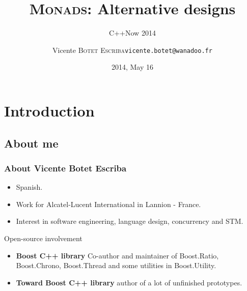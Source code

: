 \documentclass[xcolor=dvipsnames]{beamer}
\title{\textsc{Monads}: Alternative designs }
\subtitle{C++Now 2014}
\author[\textsc{Vicente Botet}]{Vicente \textsc{Botet Escriba}\texttt{vicente.botet@wanadoo.fr}}
\institute[Alcatel-Lucent]{Alcatel-Lucent International-Lannion}
\date[]{2014, May 16}
\begin{document}
\maketitle

\section{Introduction}

\subsection{About me}

\begin{frame}
\frametitle{About Vicente Botet Escriba}


\begin{itemize}
\item Spanish.
\item Work for Alcatel-Lucent International in Lannion - France.
\item Interest in software engineering, language design, concurrency and STM.
\end{itemize}

\begin{block}{Open-source involvement}
\begin{itemize}
\item \textbf{Boost C++ library} Co-author and maintainer of Boost.Ratio, Boost.Chrono, Boost.Thread and some utilities in Boost.Utility.
\item \textbf{Toward Boost C++ library} author of a lot of unfinished prototypes.
\end{itemize}
\end{block}
\end{frame}
\end{document}

